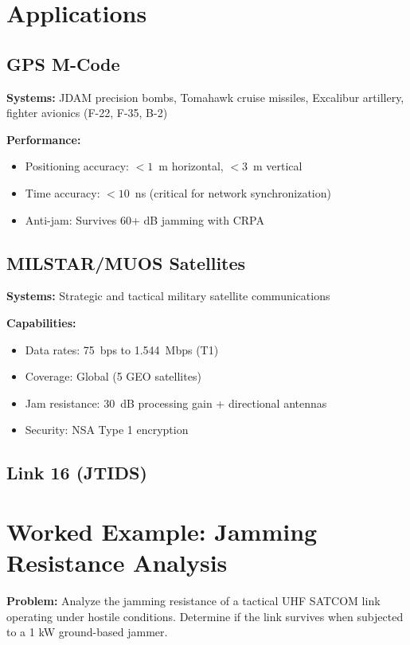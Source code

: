 \section{Applications}

\subsection{GPS M-Code}

\textbf{Systems:} JDAM precision bombs, Tomahawk cruise missiles, Excalibur artillery, fighter avionics (F-22, F-35, B-2)

\textbf{Performance:}
\begin{itemize}
\item Positioning accuracy: $<1$~m horizontal, $<3$~m vertical
\item Time accuracy: $<10$~ns (critical for network synchronization)
\item Anti-jam: Survives 60+ dB jamming with CRPA
\end{itemize}

\subsection{MILSTAR/MUOS Satellites}

\textbf{Systems:} Strategic and tactical military satellite communications

\textbf{Capabilities:}
\begin{itemize}
\item Data rates: 75~bps to 1.544~Mbps (T1)
\item Coverage: Global (5 GEO satellites)
\item Jam resistance: 30~dB processing gain + directional antennas
\item Security: NSA Type 1 encryption
\end{itemize}

\subsection{Link 16 (JTIDS)}

\section{Worked Example: Jamming Resistance Analysis}

\textbf{Problem:} Analyze the jamming resistance of a tactical UHF SATCOM link operating under hostile conditions. Determine if the link survives when subjected to a 1 kW ground-based jammer.

